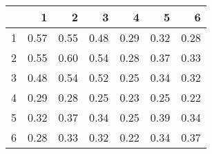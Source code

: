 \begin{table}[ht]
\begin{center}
\begin{tabular}{rrrrrrr}
  \hline
 & 1 & 2 & 3 & 4 & 5 & 6 \\ 
  \hline
1 & 0.57 & 0.55 & 0.48 & 0.29 & 0.32 & 0.28 \\ 
  2 & 0.55 & 0.60 & 0.54 & 0.28 & 0.37 & 0.33 \\ 
  3 & 0.48 & 0.54 & 0.52 & 0.25 & 0.34 & 0.32 \\ 
  4 & 0.29 & 0.28 & 0.25 & 0.23 & 0.25 & 0.22 \\ 
  5 & 0.32 & 0.37 & 0.34 & 0.25 & 0.39 & 0.34 \\ 
  6 & 0.28 & 0.33 & 0.32 & 0.22 & 0.34 & 0.37 \\ 
   \hline
\end{tabular}
\end{center}
\end{table}
